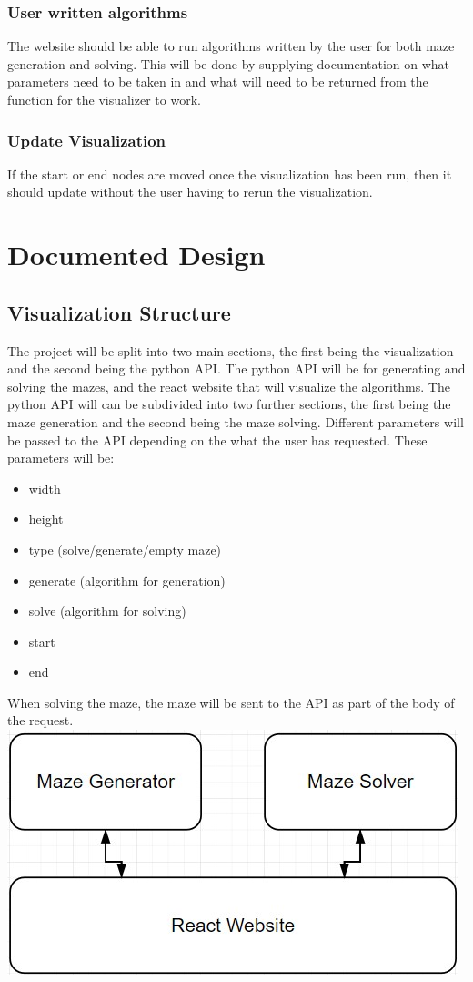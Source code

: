\documentclass[titlepage]{article}
\begin{document}
\subsubsection{User written algorithms}
The website should be able to run algorithms written by the user for both maze generation and solving. This will be done by supplying documentation on what parameters need to be taken in and what will need to be returned from the function for the visualizer to work.

\subsubsection{Update Visualization}
If the start or end nodes are moved once the visualization has been run, then it should update without the user having to rerun the visualization.

\section{Documented Design}
\subsection{Visualization Structure}
The project will be split into two main sections, the first being the visualization and the second being the python API.
The python API will be for generating and solving the mazes, and the react website that will visualize the algorithms. The python API will can be subdivided into two further sections, the first being the maze generation and the second being the maze solving. Different parameters will be passed to the API depending on the what the user has requested. These parameters will be:
\begin{itemize}
    \item width
    \item height
    \item type (solve/generate/empty maze)
    \item generate (algorithm for generation)
    \item solve (algorithm for solving)
    \item start
    \item end
\end{itemize} 

When solving the maze, the maze will be sent to the API as part of the body of the request.
\newline
\includegraphics[width=\linewidth]{assets/structure.jpg}
\end{document}

